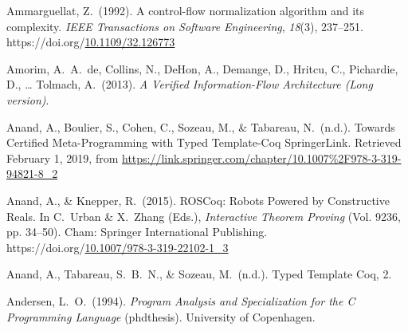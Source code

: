 \documentclass[12pt,twoside]{article}
\begin{document}
{\begin{thebibliography}{1079}
\mdbibitemlabel{}Ammarguellat, Z.~(1992). A control-flow normalization algorithm and its complexity. \emph{IEEE Transactions on Software Engineering}, \emph{18}(3), 237–251. https://doi.org/\href{https://dx.doi.org/10.1109/32.126773}{10.1109/32.126773}%

\mdbibitemlabel{}Amorim, A.~A.~de, Collins, N., DeHon, A., Demange, D., Hritcu, C., Pichardie, D., … Tolmach, A.~(2013). \emph{A Verified Information-Flow Architecture (Long version)}.%

\mdbibitemlabel{}Anand, A., Boulier, S., Cohen, C., Sozeau, M., \& Tabareau, N.~(n.d.). Towards Certified Meta-Programming with Typed Template-Coq \textbar{} SpringerLink. Retrieved February 1, 2019, from \href{https://link.springer.com/chapter/10.1007\%252F978-3-319-94821-8_2}{{\ttfamily https://\hspace{0pt}link.\hspace{0pt}springer.\hspace{0pt}com/\hspace{0pt}chapter/\hspace{0pt}10.\hspace{0pt}1007\hspace{0pt}\%2F978-\hspace{0pt}3-\hspace{0pt}319-\hspace{0pt}94821-\hspace{0pt}8\_\hspace{0pt}2}}%

\mdbibitemlabel{}Anand, A., \& Knepper, R.~(2015). ROSCoq: Robots Powered by Constructive Reals. In C.~Urban \& X.~Zhang (Eds.), \emph{Interactive Theorem Proving} (Vol. 9236, pp. 34–50). Cham: Springer International Publishing. https://doi.org/\href{https://dx.doi.org/10.1007/978-3-319-22102-1_3}{10.1007/978-3-319-22102-1\_3}%

\mdbibitemlabel{}Anand, A., Tabareau, S.~B.~N., \& Sozeau, M.~(n.d.). Typed Template Coq, 2.%

\mdbibitemlabel{}Andersen, L.~O.~(1994). \emph{Program Analysis and Specialization for the C Programming Language} (phdthesis). University of Copenhagen.%


\end{thebibliography}}
\end{document}
